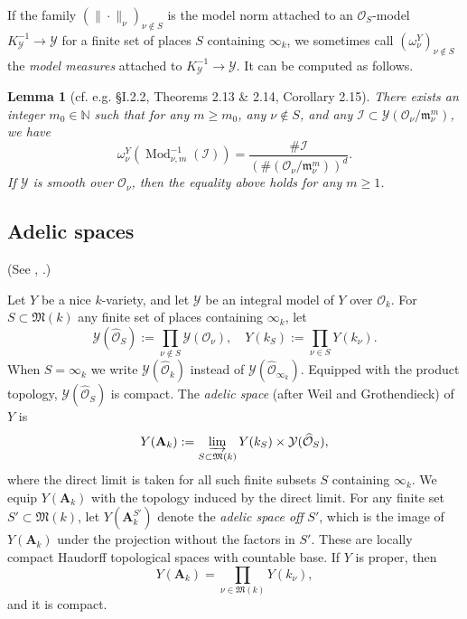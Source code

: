 \documentclass[11pt,letterpaper]{amsart}
\newcommand{\BN}{{\mathbb {N}}}
\newcommand{\CI}{{\mathcal {I}}}
\newcommand{\CO}{{\mathcal {O}}}
\newcommand{\CY}{{\mathcal {Y}}}
\newcommand{\RA}{{\mathbf {A}}}
\theoremstyle{plain}
\numberwithin{equation}{section}
\newtheorem{lemma}[theorem]{Lemma}
\theoremstyle{definition}
\theoremstyle{remark}
\begin{document}
If the family $(\|\cdot\|_\nu)_{\nu\notin S}$ is the model norm attached to an $\CO_S$-model $K_\CY^{-1}\to \CY$ for a finite set of places $S$ containing $\infty_k$, we sometimes call $(\omega^Y_\nu)_{\nu\not\in S}$ the \emph{model measures} attached to $K_\CY^{-1}\to \CY$. 
It can be computed as follows.
\begin{lemma}[cf. e.g. \cite{Oesterle}  \S I.2.2, \cite{Salberger} Theorems 2.13 \& 2.14, Corollary 2.15]\label{le:modelmeasurecomp}
	There exists an integer $m_0\in\BN$ such that for any $m\geqslant m_0$, any $\nu\notin S$, and any $\CI\subset \CY(\CO_\nu/\mathfrak{m}_{\nu}^m)$, we have \begin{equation*}
		\omega^Y_\nu(\operatorname{Mod}_{\nu,m}^{-1}(\CI))=\frac{\#\CI}{\left(\#(\CO_\nu/\mathfrak{m}_{\nu}^m)\right)^d}.
	\end{equation*}
	If $\CY$ is smooth over $\CO_\nu$, then the equality above holds for any $m\geqslant 1$.
\end{lemma}
\subsection{Adelic spaces}\label{se:adelicspaces}
(See \cite[\S I.3]{Oesterle}, \cite[\S2.7]{Wittenberg}.)

Let $Y$ be a nice $k$-variety, and let $\CY$ be an integral model of $Y$ over $\CO_k$. For  $S\subset \mathfrak{M}(k)$ any finite set of places containing $\infty_k$,
let	$$\CY(\widehat{\CO}_S):=\prod_{\nu\not\in S}\CY(\CO_\nu),\quad Y(k_S):=\prod_{\nu\in S}Y(k_\nu).$$ When $S=\infty_k$ we write $\CY(\widehat{\CO}_k)$  instead of $\CY(\widehat{\CO}_{\infty_k})$. Equipped with the product topology, $\CY(\widehat{\CO}_S)$ is compact.	The \emph{adelic space} (after Weil and Grothendieck) of $Y$ is
		\begin{equation}\label{eq:adelization}
			Y(\RA_k):=\varinjlim_{S\subset \mathfrak{M}(k)}Y(k_S)\times\CY(\widehat{\CO}_S),
		\end{equation} where the direct limit is taken for all such finite subsets $S$ containing $\infty_k$. We equip $Y(\RA_k)$ with the topology induced by the direct limit. For any finite set $S'\subset\mathfrak{M}(k)$, let $Y(\RA_k^{S'})$ denote the \emph{adelic space off} $S'$,  which is the image of $Y(\RA_k)$ under the projection without the factors in $S'$.
	These are locally compact Haudorff topological spaces with countable base.
			If $Y$ is proper, then $$Y(\RA_k)=\prod_{\nu\in\mathfrak{M}(k)} Y(k_\nu),$$ and it is compact.
		
\end{document}
